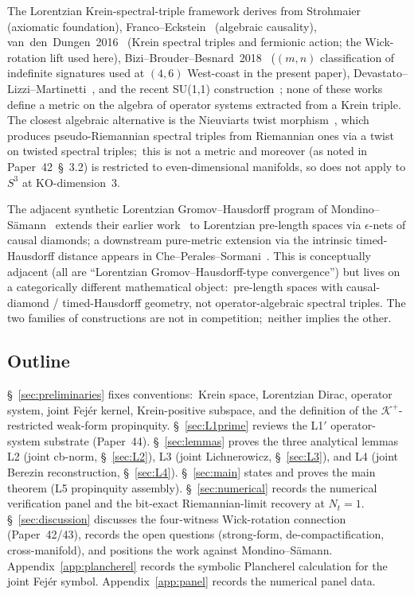 \documentclass[11pt,a4paper]{article}
\theoremstyle{plain}
\theoremstyle{definition}
\newcommand{\Nt}{N_{t}}
\newcommand{\sthree}{S^{3}}
\newcommand{\Krein}{\mathcal{K}}
\newcommand{\Kplus}{\Krein^{+}}
\begin{document}
The Lorentzian Krein-spectral-triple framework derives from
Strohmaier~\cite{strohmaier2006} (axiomatic foundation),
Franco--Eckstein~\cite{franco_eckstein2014} (algebraic causality),
van~den~Dungen~2016~\cite{vandungen2016} (Krein spectral triples and
fermionic action; the Wick-rotation lift used here),
Bizi--Brouder--Besnard~2018~\cite{bizi_brouder_besnard2018}
($(m, n)$ classification of indefinite signatures used at $(4, 6)$
West-coast in the present paper),
Devastato--Lizzi--Martinetti~\cite{devastato_lizzi_martinetti2018},
and the recent SU(1,1) construction~\cite{de_groot2026_su11}; none of
these works define a metric on the algebra of operator systems
extracted from a Krein triple. The closest algebraic alternative is
the Nieuviarts twist morphism~\cite{nieuviarts2025a,nieuviarts2025b_proceedings},
which produces pseudo-Riemannian spectral triples from Riemannian ones
via a twist on twisted spectral triples;\ this is not a metric and
moreover (as noted in Paper~42~\S~3.2) is restricted to even-dimensional
manifolds, so does not apply to $\sthree$ at KO-dimension~3.

The adjacent synthetic Lorentzian Gromov--Hausdorff program of
Mondino--S\"amann~\cite{mondino_samann2025} extends
their earlier work~\cite{mondino_samann2024} to Lorentzian pre-length
spaces via $\epsilon$-nets of causal diamonds; a downstream pure-metric
extension via the intrinsic timed-Hausdorff distance appears
in Che--Perales--Sormani~\cite{che_perales_sormani2025}. This is
conceptually adjacent (all are ``Lorentzian Gromov--Hausdorff-type
convergence'') but lives on a categorically different mathematical
object:\ pre-length spaces with causal-diamond / timed-Hausdorff
geometry, not operator-algebraic spectral triples. The two families
of constructions are not in competition;\ neither implies the other.

\subsection{Outline}\label{sec:outline}

\S~\ref{sec:preliminaries} fixes conventions:\ Krein space, Lorentzian
Dirac, operator system, joint Fej\'er kernel, Krein-positive subspace,
and the definition of the $\Kplus$-restricted weak-form propinquity.
\S~\ref{sec:L1prime} reviews the L1$'$ operator-system substrate
(Paper~44). \S~\ref{sec:lemmas} proves the three analytical lemmas
L2 (joint cb-norm, \S~\ref{sec:L2}), L3 (joint Lichnerowicz,
\S~\ref{sec:L3}), and L4 (joint Berezin reconstruction,
\S~\ref{sec:L4}). \S~\ref{sec:main} states and proves the
main theorem (L5 propinquity assembly). \S~\ref{sec:numerical}
records the numerical verification panel and the bit-exact Riemannian-limit
recovery at $\Nt = 1$. \S~\ref{sec:discussion} discusses the
four-witness Wick-rotation connection (Paper~42/43), records the open
questions (strong-form, de-compactification, cross-manifold), and
positions the work against Mondino--S\"amann.
Appendix~\ref{app:plancherel} records the symbolic Plancherel
calculation for the joint Fej\'er symbol.
Appendix~\ref{app:panel} records the numerical panel data.
\end{document}
